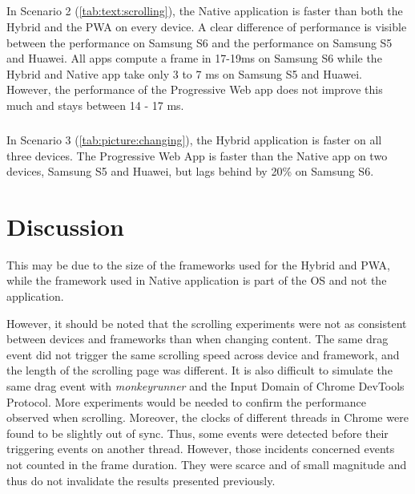 \paragraph{}
In Scenario 2 (\autoref{tab:text:scrolling}), the Native application is faster than both the Hybrid and the PWA on every device. A clear difference of performance is visible between the performance on Samsung S6 and the performance on Samsung S5 and Huawei. All apps compute a frame in 17-19ms on Samsung S6 while the Hybrid and Native app take only 3 to 7 ms on Samsung S5 and Huawei. However, the performance of the Progressive Web app does not improve this much and stays between 14 - 17 ms. 

\paragraph{}
In Scenario 3 (\autoref{tab:picture:changing}), the Hybrid application is faster on all three devices. The Progressive Web App is faster than the Native app on two devices, Samsung S5 and Huawei, but lags behind by 20\% on Samsung S6. 


\chapter{Discussion}

This may be due to the size of the frameworks used for the Hybrid and PWA, while the framework used in Native application is part of the OS and not the application.

However, it should be noted that the scrolling experiments were not as consistent between devices and frameworks than when changing content. The same drag event did not trigger the same scrolling speed across device and framework, and the length of the scrolling page was different. It is also difficult to simulate the same drag event with \textit{monkeyrunner} and the Input Domain of Chrome DevTools Protocol. More experiments would be needed to confirm the performance observed when scrolling. Moreover, the clocks of different threads in Chrome were found to be slightly out of sync. Thus, some events were detected before their triggering events on another thread. However, those incidents concerned events not counted in the frame duration. They were scarce and of small magnitude and thus do not invalidate the results presented previously.

